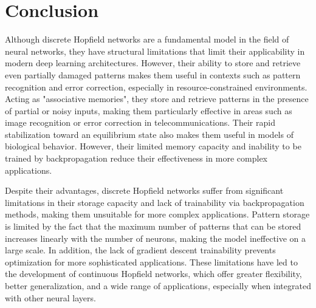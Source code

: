 \chapter{Conclusion}

Although discrete Hopfield networks are a fundamental model in the field of neural networks, they have structural limitations that limit their applicability in modern deep learning architectures. However, their ability to store and retrieve even partially damaged patterns makes them useful in contexts such as pattern recognition and error correction, especially in resource-constrained environments. Acting as "associative memories", they store and retrieve patterns in the presence of partial or noisy inputs, making them particularly effective in areas such as image recognition or error correction in telecommunications. Their rapid stabilization toward an equilibrium state also makes them useful in models of biological behavior. However, their limited memory capacity and inability to be trained by backpropagation reduce their effectiveness in more complex applications.

\noindent Despite their advantages, discrete Hopfield networks suffer from significant limitations in their storage capacity and lack of trainability via backpropagation methods, making them unsuitable for more complex applications. Pattern storage is limited by the fact that the maximum number of patterns that can be stored increases linearly with the number of neurons, making the model ineffective on a large scale. In addition, the lack of gradient descent trainability prevents optimization for more sophisticated applications. These limitations have led to the development of continuous Hopfield networks, which offer greater flexibility, better generalization, and a wide range of applications, especially when integrated with other neural layers.

